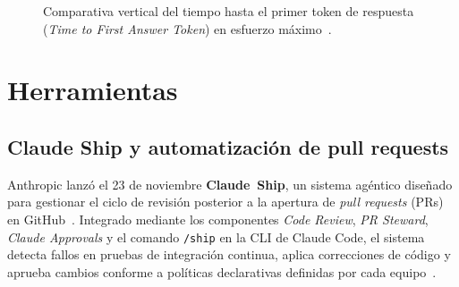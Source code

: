 \documentclass[conference,twocolumn,spanish]{IEEEtran}
\begin{document}
\begin{figure}[htbp]
\centering
{}
\caption{Comparativa vertical del tiempo hasta el primer token de respuesta (\textit{Time to First Answer Token}) en esfuerzo máximo~\cite{aa_index_2026}.}
\label{fig:aa_ttft_sem3}
\end{figure}

\section{Herramientas}

\subsection{Claude Ship y automatización de pull requests}
Anthropic lanzó el 23 de noviembre \textbf{Claude~Ship}, un sistema agéntico diseñado para gestionar el ciclo de revisión posterior a la apertura de \textit{pull requests} (PRs) en GitHub~\cite{anthropic_claude_ship_2026,techcrunch_claude_ship_2026}. Integrado mediante los componentes \textit{Code Review}, \textit{PR Steward}, \textit{Claude Approvals} y el comando \texttt{/ship} en la CLI de Claude Code, el sistema detecta fallos en pruebas de integración continua, aplica correcciones de código y aprueba cambios conforme a políticas declarativas definidas por cada equipo~\cite{anthropic_claude_ship_2026}.
\end{document}
